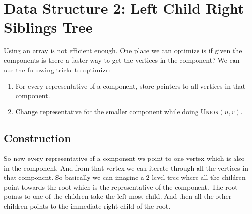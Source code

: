 \section{Data Structure 2: Left Child Right Siblings Tree}
Using an array is not efficient enough.  One place we can optimize is if given the components is there a faster way to get the vertices in the component?  We can use the following tricks to optimize:
\begin{enumerate}
	\item For every representative of a component, store pointers to all vertices in that component.
	\item Change representative for the smaller component while doing \textsc{Union}$(u,v)$.
\end{enumerate}
\subsection{Construction}
So now every representative of a component we point to one vertex which is also in the component. And from that vertex we can iterate through all the vertices in that component. So basically we can imagine a 2 level tree where all the children point towards the root which is the representative of the component. The root points to one of the children take the left most child. And then all the other children points to the immediate right child of the root.
